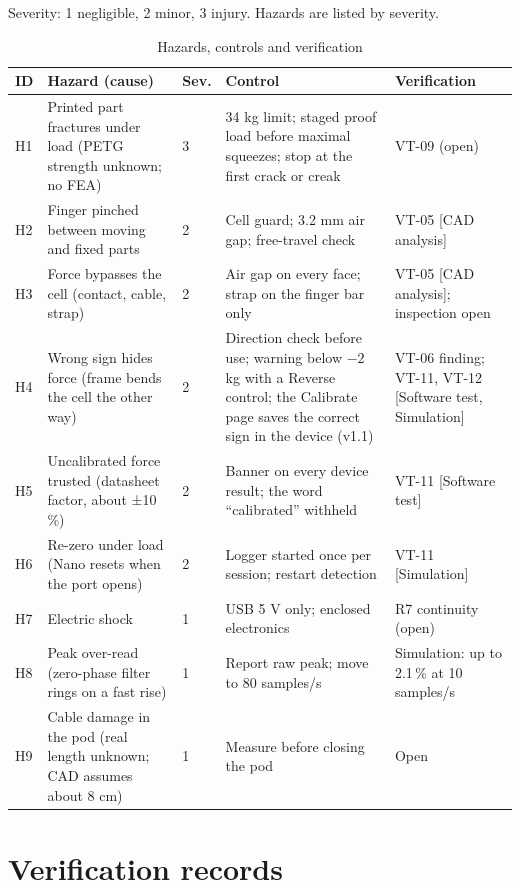 \documentclass[10pt,a4paper]{article}
\newcommand{\cadan}{CAD analysis}
\newcommand{\simul}{Simulation}
\newcommand{\swt}{Software test}
\begin{document}
Severity: 1 negligible, 2 minor, 3 injury. Hazards are listed by severity.

\begin{table}[H]
\centering\small
\caption{Hazards, controls and verification}
\begin{tabularx}{\linewidth}{@{}p{0.6cm}P{2.9cm}p{0.5cm}LP{3.0cm}@{}}
\toprule
ID & Hazard (cause) & Sev. & Control & Verification \\
\midrule
H1 & Printed part fractures under load (PETG strength unknown; no FEA) & 3 & 34 kg limit; staged proof load before maximal squeezes; stop at the first crack or creak & VT-09 (open) \\
H2 & Finger pinched between moving and fixed parts & 2 & Cell guard; 3.2 mm air gap; free-travel check & VT-05 [\cadan] \\
H3 & Force bypasses the cell (contact, cable, strap) & 2 & Air gap on every face; strap on the finger bar only & VT-05 [\cadan]; inspection open \\
H4 & Wrong sign hides force (frame bends the cell the other way) & 2 & Direction check before use; warning below $-2$ kg with a Reverse control; the Calibrate page saves the correct sign in the device (v1.1) & VT-06 finding; VT-11, VT-12 [\swt, \simul] \\
H5 & Uncalibrated force trusted (datasheet factor, about ±10\,\%) & 2 & Banner on every device result; the word ``calibrated'' withheld & VT-11 [\swt] \\
H6 & Re-zero under load (Nano resets when the port opens) & 2 & Logger started once per session; restart detection & VT-11 [\simul] \\
H7 & Electric shock & 1 & USB 5 V only; enclosed electronics & R7 continuity (open) \\
H8 & Peak over-read (zero-phase filter rings on a fast rise) & 1 & Report raw peak; move to 80 samples/s & Simulation: up to 2.1\,\% at 10 samples/s \\
H9 & Cable damage in the pod (real length unknown; CAD assumes about 8 cm) & 1 & Measure before closing the pod & Open \\
\bottomrule
\end{tabularx}
\end{table}

\section{Verification records}\label{sec:verif}
\end{document}
